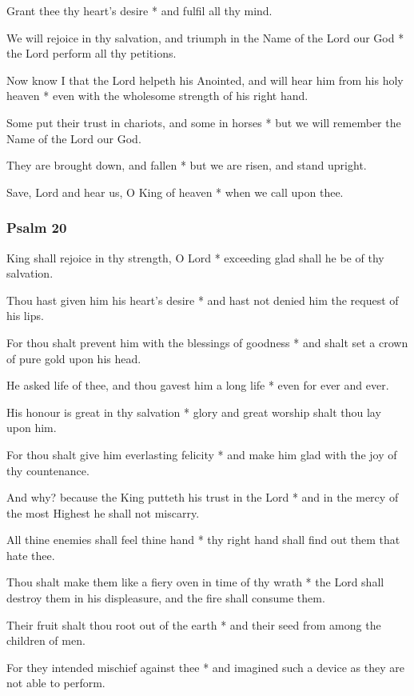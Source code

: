 Grant thee thy heart's desire * and fulfil all thy mind.

We will rejoice in thy salvation, and triumph in the Name of the Lord our God * the Lord perform all thy petitions.

Now know I that the Lord helpeth his Anointed, and will hear him from his holy heaven * even with the wholesome strength of his right hand.

Some put their trust in chariots, and some in horses * but we will remember the Name of the Lord our God.

They are brought down, and fallen * but we are risen, and stand upright.

Save, Lord and hear us, O King of heaven * when we call upon thee.

\subsubsection{Psalm 20}


 King shall rejoice in thy strength, O Lord * exceeding glad shall he be of thy salvation.

Thou hast given him his heart's desire * and hast not denied him the request of his lips.

For thou shalt prevent him with the blessings of goodness * and shalt set a crown of pure gold upon his head.

He asked life of thee, and thou gavest him a long life * even for ever and ever.

His honour is great in thy salvation * glory and great worship shalt thou lay upon him.

For thou shalt give him everlasting felicity * and make him glad with the joy of thy countenance.

And why? because the King putteth his trust in the Lord * and in the mercy of the most Highest he shall not miscarry.

All thine enemies shall feel thine hand * thy right hand shall find out them that hate thee.

Thou shalt make them like a fiery oven in time of thy wrath * the Lord shall destroy them in his displeasure, and the fire shall consume them.

Their fruit shalt thou root out of the earth * and their seed from among the children of men.

For they intended mischief against thee * and imagined such a device as they are not able to perform.

